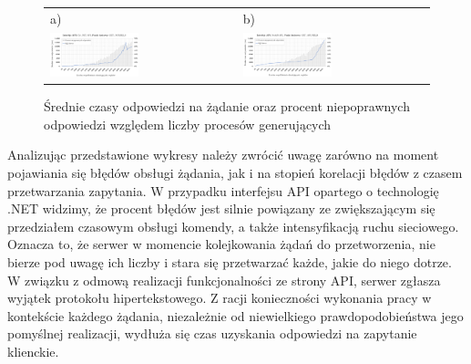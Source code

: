 \begin{figure}[htb]
    \centering
      \begin{tabular}{@{}ll@{}}
      a) & b) \\
      \includegraphics[width=0.49\textwidth]{rys05/response-and-errors-dotnet.pdf} & \includegraphics[width=0.49\textwidth]{rys05/response-and-errors-nodejs.pdf}
      \end{tabular}
    \caption{Średnie czasy odpowiedzi na żądanie oraz procent niepoprawnych odpowiedzi względem liczby procesów generujących}
    \label{fig:response-with-errors}
  \end{figure}

Analizując przedstawione wykresy należy zwrócić uwagę zarówno na moment pojawiania się błędów obsługi żądania, jak i na stopień korelacji błędów z czasem przetwarzania zapytania. W przypadku interfejsu API opartego o technologię .NET widzimy, że procent błędów jest silnie powiązany ze zwiększającym się przedziałem czasowym obsługi komendy, a także intensyfikacją ruchu sieciowego. Oznacza to, że serwer w momencie kolejkowania żądań do przetworzenia, nie bierze pod uwagę ich liczby i stara się przetwarzać każde, jakie do niego dotrze. W związku z odmową realizacji funkcjonalności ze strony API, serwer zgłasza wyjątek protokołu hipertekstowego. Z racji konieczności wykonania pracy w kontekście każdego żądania, niezależnie od niewielkiego prawdopodobieństwa jego pomyślnej realizacji, wydłuża się czas uzyskania odpowiedzi na zapytanie klienckie.

